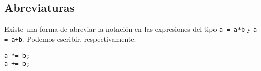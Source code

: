 \begin{comment}
\begin{ejemplo}
Los operadores de incremento y decremento ($++$ y $--$) equivalen a las sentencias del tipo \lstinline{a = a+1} o \lstinline{b = b-1}. Suman o restan una unidad a su argumento, que debe ser un tipo entero. Se comportan diferentemente según que se apliquen en forma prefija o sufija.



\begin{itemize}
	\item Aplicados como prefijos, el valor devuelto por la expresión es el valor incrementado o decrementado.
	\item Aplicados como sufijos, el incremento o decremento se realiza como efecto lateral, pero el valor devuelto por la expresión es el anterior al incremento o decremento.
\end{itemize}
\end{ejemplo}
\end{comment}

\subsection{Abreviaturas}
Existe una forma de abreviar la notación en las expresiones del tipo \lstinline{a = a*b} y \lstinline{a = a+b}. Podemos escribir, respectivamente:
\begin{lstlisting}
a *= b;
a += b; 
\end{lstlisting}

